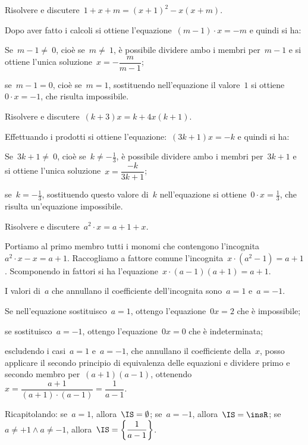 \begin{exrig}
 \begin{esempio}
Risolvere e discutere~$1+x+m=(x+1)^{2}-x(x+m)$.

Dopo aver fatto i calcoli si ottiene l’equazione~$(m-1)\cdot x=-m$ e quindi si ha:
\begin{itemize*}
 \item Se~$m-1\neq~0$, cioè se~$m\neq~1$, è possibile dividere ambo i membri per~$m-1$ e si ottiene l’unica soluzione~$x=-{\dfrac{m}{m-1}}$;
 \item se~$m-1=0$, cioè se~$m=1$, sostituendo nell'equazione il valore~$1$ si ottiene~$0\cdot x=-1$, che risulta impossibile.
\end{itemize*}
 \end{esempio}

 \begin{esempio}
Risolvere e discutere~$(k+3)x=k+4x(k+1)$.

Effettuando i prodotti si ottiene l’equazione:~$(3k+1)x=-k$ e quindi si ha:
\begin{itemize*}
 \item Se~$3k+1\neq~0$, cioè se~$k\neq -{\frac{1}{3}}$, è possibile dividere ambo i membri per~$3k+1$ e si ottiene l’unica soluzione~$x=\dfrac{-k}{3k+1}$;
 \item se~$k=-{\frac{1}{3}}$, sostituendo questo valore di~$k$ nell'equazione si ottiene~$0\cdot x=\frac{1}{3}$, che risulta un'equazione impossibile.
\end{itemize*}
 \end{esempio}

 \begin{esempio}
Risolvere e discutere~$a^{2}\cdot x=a+1+x$.

Portiamo al primo membro tutti i monomi che contengono l'incognita~$a^{2}\cdot x-x=a+1$.
Raccogliamo a fattore comune l'incognita~$x\cdot \left(a^{2}-1\right)=a+1$.
Scomponendo in fattori si ha l'equazione~$x\cdot \left(a-1\right)\left(a+1\right)=a+1$.

I valori di~$a$ che annullano il coefficiente dell'incognita sono~$a=1$ e~$a=-1$.
\begin{itemize*}
 \item Se nell'equazione sostituisco~$a=1$, ottengo l'equazione~$0x=2$ che è impossibile;
 \item se sostituisco~$a=-1$, ottengo l'equazione~$0x=0$ che è indeterminata;
 \item escludendo i casi~$a=1$ e~$a=-1$, che annullano il coefficiente della~$x$, posso applicare il secondo principio
    di equivalenza delle equazioni e dividere primo e secondo membro per~$(a+1)(a-1)$, ottenendo~$x=\dfrac{a+1}{\left(a+1\right)\cdot \left(a-1\right)}=\dfrac{1}{a-1}$.
\end{itemize*}
 \end{esempio}
Ricapitolando:
se~$a=1$, allora~$\IS=\emptyset$; se~$a=-1$, allora~$\IS=\insR$; se~$a\neq +1\wedge a\neq -1$, allora~$\IS=\left\{\dfrac{1}{a-1}\right\}$.
\end{exrig}


